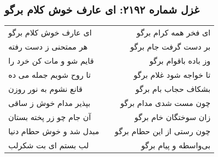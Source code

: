 \begin{center}
\section*{غزل شماره ۲۱۹۲: ای عارف خوش کلام برگو}
\label{sec:2192}
\begin{longtable}{l p{0.5cm} r}
ای عارف خوش کلام برگو
&&
ای فخر همه کرام برگو
\\
هر ممتحنی ز دست رفته
&&
بر دست گرفت جام برگو
\\
قایم شو و مات کن خرد را
&&
وز باده باقوام برگو
\\
تا روح شویم جمله می ده
&&
تا خواجه شود غلام برگو
\\
قانع نشوم به نور روزن
&&
بشکاف حجاب بام برگو
\\
بپذیر مدام خوش ز ساقی
&&
چون مست شدی مدام برگو
\\
آن جام چو زر پخته بستان
&&
زان سوختگان خام برگو
\\
مبدل شد و خوش حطام دنیا
&&
چون رستی از این حطام برگو
\\
لب بستم ای بت شکرلب
&&
بی‌واسطه و پیام برگو
\\
\end{longtable}
\end{center}
